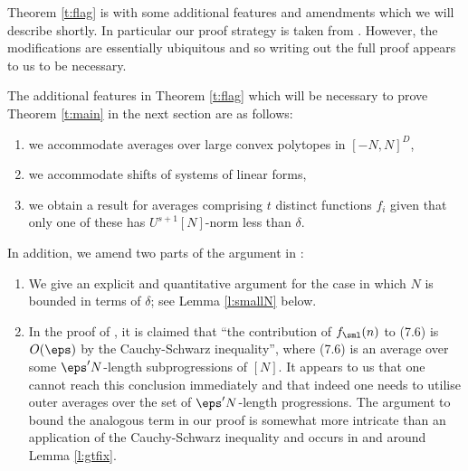 Theorem \ref{t:flag} is \cite[Theorem 1.13]{GT10} with some additional features and amendments which we will describe shortly. In particular our proof strategy is taken from \cite[Theorem 1.13]{GT10}. However, the modifications are essentially ubiquitous and so writing out the full proof appears to us to be necessary. 

The additional features in Theorem \ref{t:flag} which will be necessary to prove Theorem \ref{t:main} in the next section are as follows: 
\begin{enumerate}
\item we accommodate averages over large convex polytopes in $[-N,N]^D$,
\item we accommodate shifts of systems of linear forms, 
\item we obtain a result for averages comprising $t$ distinct functions $f_i$ given that only one of these has $U^{s+1}[N]$-norm less than $\delta$.
\end{enumerate}

In addition, we amend two parts of the argument in \cite[Theorem 1.13]{GT10}:
\begin{enumerate}
\item We give an explicit and quantitative argument for the case in which $N$ is bounded in terms of $\delta$; see Lemma \ref{l:smallN} below.
\item In the proof of \cite[Proposition 7.2]{GT10}, it is claimed that ``the contribution of $f_\sml(n)$ to (7.6) is $O(\eps)$ by the Cauchy-Schwarz inequality'', where (7.6) is an average over some  $\eps' N$-length subprogressions of $[N]$. It appears to us that one cannot reach this conclusion immediately and that indeed one needs to utilise outer averages over the set of $\eps'N$-length progressions.  The argument to bound the analogous term in our proof  is somewhat more intricate than an application of the Cauchy-Schwarz inequality and occurs in and around Lemma \ref{l:gtfix}.
\end{enumerate} 

